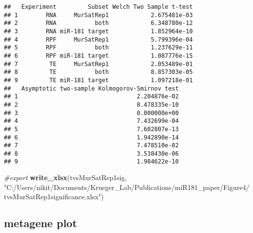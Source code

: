\documentclass[
]{article}
\newenvironment{Shaded}{\begin{snugshade}}{\end{snugshade}}
\newcommand{\AttributeTok}[1]{\textcolor[rgb]{0.13,0.29,0.53}{#1}}
\newcommand{\CommentTok}[1]{\textcolor[rgb]{0.56,0.35,0.01}{\textit{#1}}}
\newcommand{\FunctionTok}[1]{\textcolor[rgb]{0.13,0.29,0.53}{\textbf{#1}}}
\newcommand{\NormalTok}[1]{#1}
\newcommand{\OtherTok}[1]{\textcolor[rgb]{0.56,0.35,0.01}{#1}}
\newcommand{\SpecialCharTok}[1]{\textcolor[rgb]{0.81,0.36,0.00}{\textbf{#1}}}
\newcommand{\StringTok}[1]{\textcolor[rgb]{0.31,0.60,0.02}{#1}}
\begin{document}
\begin{verbatim}
##   Experiment         Subset Welch Two Sample t-test
## 1        RNA     MurSatRep1            2.675481e-03
## 2        RNA           both            6.348780e-12
## 3        RNA miR-181 target            1.852964e-10
## 4        RPF     MurSatRep1            5.799396e-04
## 5        RPF           both            1.237629e-11
## 6        RPF miR-181 target            1.087776e-15
## 7         TE     MurSatRep1            2.053489e-01
## 8         TE           both            8.857303e-05
## 9         TE miR-181 target            1.097218e-01
##   Asymptotic two-sample Kolmogorov-Smirnov test
## 1                                  2.204876e-02
## 2                                  8.478335e-10
## 3                                  0.000000e+00
## 4                                  7.432699e-04
## 5                                  7.602807e-13
## 6                                  1.942890e-14
## 7                                  7.478510e-02
## 8                                  3.538430e-06
## 9                                  1.984622e-10
\end{verbatim}

\begin{Shaded}
\begin{Highlighting}[]
\CommentTok{\#export}
\FunctionTok{write\_xlsx}\NormalTok{(tvsMurSatRep1sig, }\StringTok{"C:/Users/nikit/Documents/Krueger\_Lab/Publications/miR181\_paper/Figure4/tvsMurSatRep1significance.xlsx"}\NormalTok{)}
\end{Highlighting}
\end{Shaded}

\hypertarget{metagene-plot}{%
\subsection{metagene plot}\label{metagene-plot}}

\begin{Shaded}
\end{Shaded}
\end{document}
